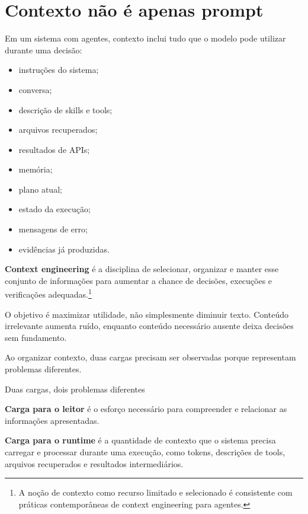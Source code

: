 \documentclass[
  10pt,
  a4paper,
  oneside]{book}
\providecommand{\tightlist}{%
  \setlength{\itemsep}{0pt}\setlength{\parskip}{0pt}}
\begin{document}
\hypertarget{contexto-nuxe3o-uxe9-apenas-prompt}{%
\section{Contexto não é apenas
prompt}\label{contexto-nuxe3o-uxe9-apenas-prompt}}

Em um sistema com agentes, contexto inclui tudo que o modelo pode
utilizar durante uma decisão:

\begin{itemize}
\tightlist
\item
  instruções do sistema;
\item
  conversa;
\item
  descrição de skills e tools;
\item
  arquivos recuperados;
\item
  resultados de APIs;
\item
  memória;
\item
  plano atual;
\item
  estado da execução;
\item
  mensagens de erro;
\item
  evidências já produzidas.
\end{itemize}

\textbf{Context engineering} é a disciplina de selecionar, organizar e
manter esse conjunto de informações para aumentar a chance de decisões,
execuções e verificações adequadas.\footnote{A noção de contexto como
  recurso limitado e selecionado é consistente com práticas
  contemporâneas de context engineering para agentes.}

O objetivo é maximizar utilidade, não simplesmente diminuir texto.
Conteúdo irrelevante aumenta ruído, enquanto conteúdo necessário ausente
deixa decisões sem fundamento.


Ao organizar contexto, duas cargas precisam ser observadas porque
representam problemas diferentes.

\begin{infobox}{Duas cargas, dois problemas diferentes}

\textbf{Carga para o leitor} é o esforço necessário para compreender e
relacionar as informações apresentadas.

\textbf{Carga para o runtime} é a quantidade de contexto que o sistema
precisa carregar e processar durante uma execução, como tokens,
descrições de tools, arquivos recuperados e resultados intermediários.

\end{infobox}
\end{document}
